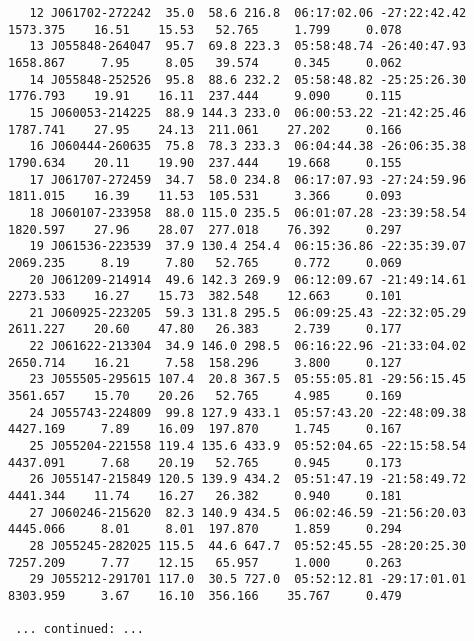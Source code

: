 \begin{landscape}
{\begin{verbatim}
   12 J061702-272242  35.0  58.6 216.8  06:17:02.06 -27:22:42.42 1573.375    16.51    15.53   52.765     1.799     0.078 
   13 J055848-264047  95.7  69.8 223.3  05:58:48.74 -26:40:47.93 1658.867     7.95     8.05   39.574     0.345     0.062 
   14 J055848-252526  95.8  88.6 232.2  05:58:48.82 -25:25:26.30 1776.793    19.91    16.11  237.444     9.090     0.115 
   15 J060053-214225  88.9 144.3 233.0  06:00:53.22 -21:42:25.46 1787.741    27.95    24.13  211.061    27.202     0.166 
   16 J060444-260635  75.8  78.3 233.3  06:04:44.38 -26:06:35.38 1790.634    20.11    19.90  237.444    19.668     0.155 
   17 J061707-272459  34.7  58.0 234.8  06:17:07.93 -27:24:59.96 1811.015    16.39    11.53  105.531     3.366     0.093 
   18 J060107-233958  88.0 115.0 235.5  06:01:07.28 -23:39:58.54 1820.597    27.96    28.07  277.018    76.392     0.297 
   19 J061536-223539  37.9 130.4 254.4  06:15:36.86 -22:35:39.07 2069.235     8.19     7.80   52.765     0.772     0.069 
   20 J061209-214914  49.6 142.3 269.9  06:12:09.67 -21:49:14.61 2273.533    16.27    15.73  382.548    12.663     0.101 
   21 J060925-223205  59.3 131.8 295.5  06:09:25.43 -22:32:05.29 2611.227    20.60    47.80   26.383     2.739     0.177 
   22 J061622-213304  34.9 146.0 298.5  06:16:22.96 -21:33:04.02 2650.714    16.21     7.58  158.296     3.800     0.127 
   23 J055505-295615 107.4  20.8 367.5  05:55:05.81 -29:56:15.45 3561.657    15.70    20.26   52.765     4.985     0.169 
   24 J055743-224809  99.8 127.9 433.1  05:57:43.20 -22:48:09.38 4427.169     7.89    16.09  197.870     1.745     0.167 
   25 J055204-221558 119.4 135.6 433.9  05:52:04.65 -22:15:58.54 4437.091     7.68    20.19   52.765     0.945     0.173 
   26 J055147-215849 120.5 139.9 434.2  05:51:47.19 -21:58:49.72 4441.344    11.74    16.27   26.382     0.940     0.181 
   27 J060246-215620  82.3 140.9 434.5  06:02:46.59 -21:56:20.03 4445.066     8.01     8.01  197.870     1.859     0.294 
   28 J055245-282025 115.5  44.6 647.7  05:52:45.55 -28:20:25.30 7257.209     7.77    12.15   65.957     1.000     0.263 
   29 J055212-291701 117.0  30.5 727.0  05:52:12.81 -29:17:01.01 8303.959     3.67    16.10  356.166    35.767     0.479 

 ... continued: ...


\end{verbatim}}
\end{landscape}
